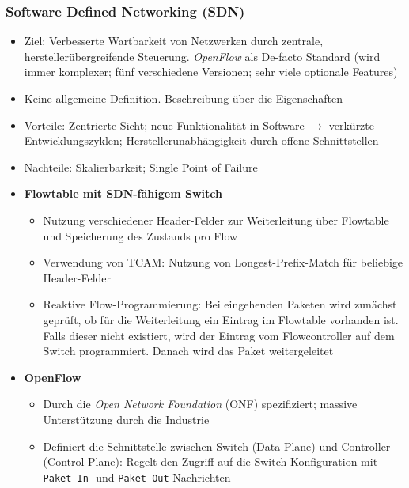 \subsubsection{Software Defined Networking (SDN)}
\begin{itemize}
	\item Ziel: Verbesserte Wartbarkeit von Netzwerken durch zentrale, herstellerübergreifende Steuerung. \textit{OpenFlow} als De-facto Standard (wird immer komplexer; fünf verschiedene Versionen; sehr viele optionale Features)
	\item Keine allgemeine Definition. Beschreibung über die Eigenschaften
	\item Vorteile: Zentrierte Sicht; neue Funktionalität in Software \(\rightarrow\) verkürzte Entwicklungszyklen; Herstellerunabhängigkeit durch offene Schnittstellen
	\item Nachteile: Skalierbarkeit; Single Point of Failure
	\item \textbf{Flowtable mit SDN-fähigem Switch}
	\begin{itemize}
		\item Nutzung verschiedener Header-Felder zur Weiterleitung über Flowtable und Speicherung des Zustands pro Flow
		\item Verwendung von TCAM: Nutzung von Longest-Prefix-Match für beliebige Header-Felder
		\item Reaktive Flow-Programmierung: Bei eingehenden Paketen wird zunächst geprüft, ob für die Weiterleitung ein Eintrag im Flowtable vorhanden ist. Falls dieser nicht existiert, wird der Eintrag vom Flowcontroller auf dem Switch programmiert. Danach wird das Paket weitergeleitet
	\end{itemize}
	\item \textbf{OpenFlow}
	\begin{itemize}
		\item Durch die \textit{Open Network Foundation} (ONF) spezifiziert; massive Unterstützung durch die Industrie
		\item Definiert die Schnittstelle zwischen Switch (Data Plane) und Controller (Control Plane): Regelt den Zugriff auf die Switch-Konfiguration mit \texttt{Paket-In}- und \texttt{Paket-Out}-Nachrichten
	\end{itemize}
\end{itemize}

